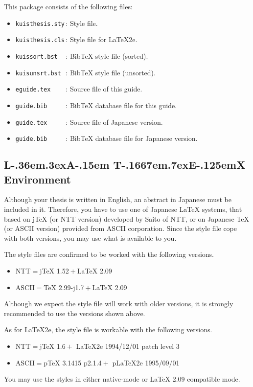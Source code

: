 \documentclass[master,english]{kuisthesis}
\def\LATex{\iLATEX\small}
\def\iLATEX#1{L\kern-.36em\raise.3ex\hbox{#1\bf A}\kern-.15em
    T\kern-.1667em\lower.7ex\hbox{E}\kern-.125emX}
\def\LATEXe{\ifx\LaTeXe\undefined \LaTeX 2e\else\LaTeXe\fi}
\def\|{\verb|}
\begin{document}
This package consists of the following files:
\begin{itemize}%{
\item
\|kuisthesis.sty|\,:
Style file.
\item
\|kuisthesis.cls|\,:
Style file for \LATEXe.
\item
\|kuissort.bst  |\,:
Bib\TeX{} style file (sorted).
\item
\|kuisunsrt.bst |\,:
Bib\TeX{} style file (unsorted).
\item
\|eguide.tex    |\,:
Source file of this guide. 
\item
\|guide.bib     |\,:
Bib\TeX{} database file for this guide.
\item
\|guide.tex     |\,:
Source file of Japanese version.
\item
\|guide.bib     |\,:
Bib\TeX{} database file for Japanese version.
\end{itemize}%

\subsection[{\protect\LaTeX} Environment]{{\protect\LATex} Environment}
\label{appsub-env}
Although your thesis is written in English, an abstract in Japanese must be
included in it.  Therefore, you have to use one of Japanese {\LaTeX}
systems, that based on j{\TeX} (or NTT version) developed by Saito of NTT,
or on Japanese {\TeX} (or ASCII version) provided from ASCII corporation.
Since the style file cope with both versions, you may use what is available
to you.

The style files are confirmed to be worked with the following versions.
\begin{itemize}%
\item
NTT${}={}${j\TeX} 1.52${}+{}${\LaTeX} 2.09
\item 
ASCII${}={}${\TeX} 2.99-j1.7${}+{}${\LaTeX} 2.09
\end{itemize}%
Although we expect the style file will work with older versions, it is
strongly recommended to use the versions shown above.

As for {\LATEXe}, the style file is workable with the following versions.
\begin{itemize}%
\item
NTT${}={}${j\TeX} 1.6${}+{}$%
	{\LATEXe} 1994/12/01 patch level 3
\item 
ASCII${}={}${p\TeX} 3.1415 p2.1.4${}+{}$%
	{p\LATEXe} 1995/09/01
\end{itemize}%
You may use the styles in either native-mode or {\LaTeX} 2.09 compatible
mode.

\end{document}
